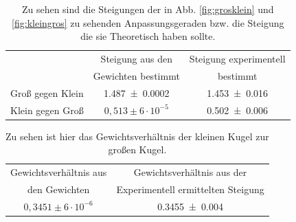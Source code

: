 \begin{table}[h]
	\caption{Zu sehen sind die Steigungen der in Abb. \ref{fig:grosklein} und \ref{fig:kleingros} zu sehenden Anpassungsgeraden bzw. die Steigung die sie Theoretisch haben sollte.}
	\begin{tabular}{|c|c|c|}
		\hline
		& Steigung aus den & Steigung experimentell\\
		& Gewichten bestimmt & bestimmt\\
		\hline
		Groß gegen Klein &  \SI{1,487+-0,0002}{} & \SI{1,453+-0,016}{} \\
		\hline
		Klein gegen Groß & $0,513 \pm 6 \cdot 10^{-5}$&\SI{0,502+-0,006}{}\\
		\hline
	\end{tabular}
\label{tab:steigung}
\end{table}

\begin{table}[h]
	\caption{Zu sehen ist hier das Gewichtsverhältnis der kleinen Kugel zur großen Kugel. }
	\begin{tabular}{|c|c|}
		\hline
		Gewichtsverhältnis aus  & Gewichtsverhältnis aus der\\
		 den Gewichten &  Experimentell ermittelten Steigung\\
		\hline
		$0,3451 \pm 6 \cdot 10^{-6}$& \SI{0,3455+-0,004}{}\\
		\hline
	\end{tabular}
	\label{tab:Gewicht}
\end{table}
